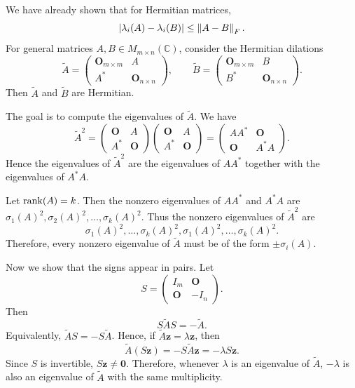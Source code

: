 \begin{pfbox}
We have already shown that for Hermitian matrices,
\[
    \left\lvert \lambda_i(A)-\lambda_i(B) \right\rvert
    \le
    \left\lVert A-B \right\rVert_F.
\]
For general matrices $A,B\in M_{m\times n}(\mathbb{C})$, consider the
Hermitian dilations
\[
    \widetilde{A}
    =
    \begin{pmatrix}
        \mathbf{O}_{m\times m} & A \\
        A^*                    & \mathbf{O}_{n\times n}
    \end{pmatrix},
    \qquad
    \widetilde{B}
    =
    \begin{pmatrix}
        \mathbf{O}_{m\times m} & B \\
        B^*                    & \mathbf{O}_{n\times n}
    \end{pmatrix}.
\]
Then $\widetilde{A}$ and $\widetilde{B}$ are Hermitian.

The goal is to compute the eigenvalues of $\widetilde{A}$. We have
\[
    \widetilde{A}^2
    =
    \begin{pmatrix}
        \mathbf{O} & A \\
        A^*        & \mathbf{O}
    \end{pmatrix}
    \begin{pmatrix}
        \mathbf{O} & A \\
        A^*        & \mathbf{O}
    \end{pmatrix}
    =
    \begin{pmatrix}
        AA^*      & \mathbf{O} \\
        \mathbf{O} & A^*A
    \end{pmatrix}.
\]
Hence the eigenvalues of $\widetilde{A}^2$ are the eigenvalues of $AA^*$
together with the eigenvalues of $A^*A$.

Let $\operatorname{rank}(A)=k$. Then the nonzero eigenvalues of $AA^*$ and $A^*A$ are
$\sigma_1(A)^2,\sigma_2(A)^2,\ldots,\sigma_k(A)^2$. Thus the nonzero
eigenvalues of $\widetilde{A}^2$ are
\[
    \sigma_1(A)^2,\ldots,\sigma_k(A)^2,
    \sigma_1(A)^2,\ldots,\sigma_k(A)^2.
\]
Therefore, every nonzero eigenvalue of $\widetilde{A}$ must be of the form
$\pm\sigma_i(A)$.

Now we show that the signs appear in pairs. Let
\[
    S
    =
    \begin{pmatrix}
        I_m        & \mathbf{O} \\
        \mathbf{O} & -I_n
    \end{pmatrix}.
\]
Then
\[
    S\widetilde{A}S
    =
    -\widetilde{A}.
\]
Equivalently, $\widetilde{A}S=-S\widetilde{A}$. Hence, if
$\widetilde{A}\mathbf{z}=\lambda\mathbf{z}$, then
\[
    \widetilde{A}(S\mathbf{z})
    =
    -S\widetilde{A}\mathbf{z}
    =
    -\lambda S\mathbf{z}.
\]
Since $S$ is invertible, $S\mathbf{z}\neq \mathbf{0}$. Therefore, whenever
$\lambda$ is an eigenvalue of $\widetilde{A}$, $-\lambda$ is also an
eigenvalue of $\widetilde{A}$ with the same multiplicity.


\end{pfbox}
